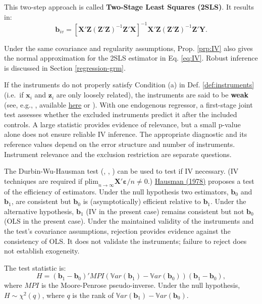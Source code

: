 \documentclass[
  11pt,
]{book}
\theoremstyle{definition}
\theoremstyle{definition}
\theoremstyle{definition}
\theoremstyle{definition}
\theoremstyle{remark}
\begin{document}
This two-step approach is called \textbf{Two-Stage Least Squares (2SLS)}. It results in:
\begin{equation}
\boxed{\mathbf{b}_{iv} = [\mathbf{X}'\mathbf{Z}(\mathbf{Z}'\mathbf{Z})^{-1}\mathbf{Z}'\mathbf{X}]^{-1}\mathbf{X}'\mathbf{Z}(\mathbf{Z}'\mathbf{Z})^{-1}\mathbf{Z}'\mathbf{Y}.} \label{eq:IV}
\end{equation}

Under the same covariance and regularity assumptions, Prop. \ref{prp:IV} also gives the normal approximation for the 2SLS estimator in Eq. \eqref{eq:IV}. Robust inference is discussed in Section \ref{regression-grm}.

If the instruments do not properly satisfy Condition (a) in Def. \ref{def:instruments} (i.e.~if \(\mathbf{x}_i\) and \(\mathbf{z}_i\) are only loosely related), the instruments are said to be \textbf{weak} (see, e.g., \citet{stock_yogo_2005}, available \href{http://scholar.harvard.edu/files/stock/files/testing_for_weak_instruments_in_linear_iv_regression.pdf}{here} or \citet{Andrews_Stock_Sun_2019}). With one endogenous regressor, a first-stage joint test assesses whether the excluded instruments predict it after the included controls. A large statistic provides evidence of relevance, but a small p-value alone does not ensure reliable IV inference. The appropriate diagnostic and its reference values depend on the error structure and number of instruments. Instrument relevance and the exclusion restriction are separate questions.

The Durbin-Wu-Hausman test (\citet{Durbin_1954}, \citet{Wu_1973}, \citet{Hausman_1978}) can be used to test if IV necessary. (IV techniques are required if \(\mbox{plim}_{n \rightarrow \infty} \mathbf{X}'\boldsymbol\varepsilon / n \ne 0\).) \href{http://www.jstor.org/stable/1913827?seq=1\#page_scan_tab_contents}{Hausman (1978)} proposes a test of the efficiency of estimators. Under the null hypothesis two estimators, \(\mathbf{b}_0\) and \(\mathbf{b}_1\), are consistent but \(\mathbf{b}_0\) is (asymptotically) efficient relative to \(\mathbf{b}_1\). Under the alternative hypothesis, \(\mathbf{b}_1\) (IV in the present case) remains consistent but not \(\mathbf{b}_0\) (OLS in the present case). Under the maintained validity of the instruments and the test's covariance assumptions, rejection provides evidence against the consistency of OLS. It does not validate the instruments; failure to reject does not establish exogeneity.

The test statistic is:
\[
H = (\mathbf{b}_1 - \mathbf{b}_0)' MPI(\mathbb{V}ar(\mathbf{b}_1) - \mathbb{V}ar(\mathbf{b}_0))(\mathbf{b}_1 - \mathbf{b}_0),
\]
where \(MPI\) is the Moore-Penrose pseudo-inverse. Under the null hypothesis, \(H \sim \chi^2(q)\), where \(q\) is the rank of \(\mathbb{V}ar(\mathbf{b}_1) - \mathbb{V}ar(\mathbf{b}_0)\).
\end{document}
